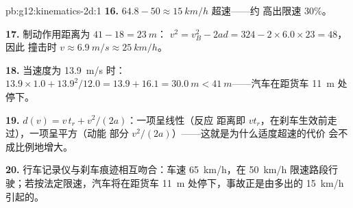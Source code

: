 \begin{solution}{pb:g12:kinematics-2d:1}
\textbf{16.} $64.8 - 50 \approx \qty{15}{km/h}$ 超速——约
高出限速 $30\%$。

\textbf{17.} 制动作用距离为 $41 - 18 = \qty{23}{m}$：
$v^2 = v_B^2 - 2ad = 324 - 2 \times 6.0 \times 23 = 48$，因此
撞击时 $v \approx \qty{6.9}{m/s} \approx \qty{25}{km/h}$。

\textbf{18.} 当速度为 \qty{13.9}{m/s} 时：$13.9 \times 1.0 + 13.9^2/12.0 =
13.9 + 16.1 = \qty{30.0}{m} < \qty{41}{m}$——汽车在距货车
\qty{11}{m} 处停下。

\textbf{19.} $d(v) = v\,t_r + v^2/(2a)$：一项呈线性（反应
距离即 $v t_r$，在刹车生效前走过），一项呈平方（动能
部分 $v^2/(2a)$）——这就是为什么适度超速的代价
会不成比例地增大。

\textbf{20.} 行车记录仪与刹车痕迹相互吻合：车速 \qty{65}{km/h}，在
\qty{50}{km/h} 限速路段行驶；若按法定限速，汽车将在距货车
\qty{11}{m} 处停下，事故正是由多出的
\qty{15}{km/h} 引起的。
\end{solution}
